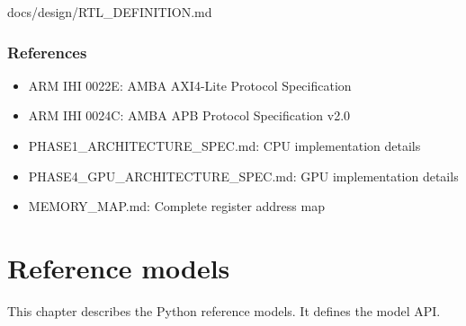 \begin{relocated}{docs/design/RTL_DEFINITION.md}
\subsection{References}\label{ds:ch:rtl-definition:references}

\begin{itemize}
\tightlist
\item
  ARM IHI 0022E: AMBA AXI4-Lite Protocol Specification
\item
  ARM IHI 0024C: AMBA APB Protocol Specification v2.0
\item
  PHASE1\_\allowbreak{}ARCHITECTURE\_\allowbreak{}SPEC.md: CPU
  implementation details
\item
  PHASE4\_\allowbreak{}GPU\_\allowbreak{}ARCHITECTURE\_\allowbreak{}SPEC.md:
  GPU implementation details
\item
  MEMORY\_\allowbreak{}MAP.md: Complete register address map
\end{itemize}
\end{relocated}

\chapter{Reference models}\label{ds:ch:reference-models}

This chapter describes the Python reference models. It defines the model API.

